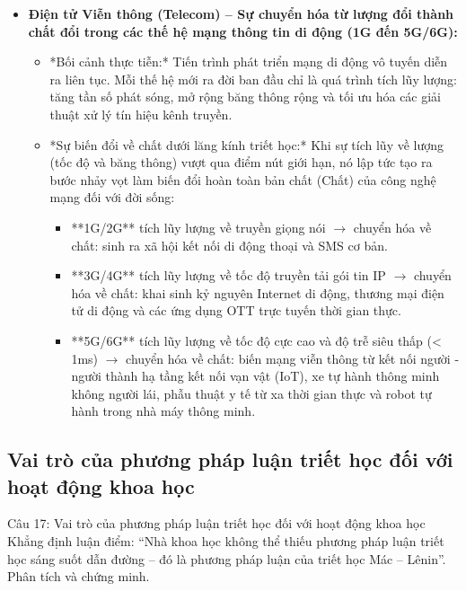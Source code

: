 \documentclass[12pt,a4paper]{article}
\begin{document}
{\begin{itemize}
    \item \textbf{Điện tử Viễn thông (Telecom) -- Sự chuyển hóa từ lượng đổi thành chất đổi trong các thế hệ mạng thông tin di động (1G đến 5G/6G):}
    \begin{itemize}
        \item *Bối cảnh thực tiễn:* Tiến trình phát triển mạng di động vô tuyến diễn ra liên tục. Mỗi thế hệ mới ra đời ban đầu chỉ là quá trình tích lũy lượng: tăng tần số phát sóng, mở rộng băng thông rộng và tối ưu hóa các giải thuật xử lý tín hiệu kênh truyền.
        \item *Sự biến đổi về chất dưới lăng kính triết học:* Khi sự tích lũy về lượng (tốc độ và băng thông) vượt qua điểm nút giới hạn, nó lập tức tạo ra bước nhảy vọt làm biến đổi hoàn toàn bản chất (Chất) của công nghệ mạng đối với đời sống:
        \begin{itemize}
            \item **1G/2G** tích lũy lượng về truyền giọng nói $\rightarrow$ chuyển hóa về chất: sinh ra xã hội kết nối di động thoại và SMS cơ bản.
            \item **3G/4G** tích lũy lượng về tốc độ truyền tải gói tin IP $\rightarrow$ chuyển hóa về chất: khai sinh kỷ nguyên Internet di động, thương mại điện tử di động và các ứng dụng OTT trực tuyến thời gian thực.
            \item **5G/6G** tích lũy lượng về tốc độ cực cao và độ trễ siêu thấp (< 1ms) $\rightarrow$ chuyển hóa về chất: biến mạng viễn thông từ kết nối người - người thành hạ tầng kết nối vạn vật (IoT), xe tự hành thông minh không người lái, phẫu thuật y tế từ xa thời gian thực và robot tự hành trong nhà máy thông minh.
        \end{itemize}
    \end{itemize}
\end{itemize}

\subsection{Vai trò của phương pháp luận triết học đối với hoạt động khoa học}

\begin{questionbox}{Câu 17: Vai trò của phương pháp luận triết học đối với hoạt động khoa học}
Khẳng định luận điểm: ``Nhà khoa học không thể thiếu phương pháp luận triết học sáng suốt dẫn đường -- đó là phương pháp luận của triết học Mác -- Lênin''. Phân tích và chứng minh.
\end{questionbox}

}
\end{document}
